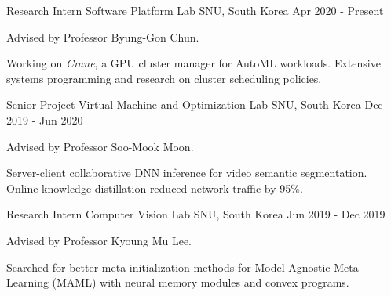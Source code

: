 

\begin{cventries}

  \cventry
    {Research Intern} %
    {Software Platform Lab} %
    {SNU, South Korea} %
    {Apr 2020 - Present} %
    {
      \begin{cvitems} %
        \item {Advised by Professor Byung-Gon Chun.}
        \item {Working on \textit{Crane}, a GPU cluster manager for AutoML workloads. Extensive systems programming and research on cluster scheduling policies.}
      \end{cvitems}
    }
    
  \cventry
    {Senior Project} %
    {Virtual Machine and Optimization Lab} %
    {SNU, South Korea} %
    {Dec 2019 - Jun 2020} %
    {
      \begin{cvitems} %
        \item {Advised by Professor Soo-Mook Moon.}
        \item {Server-client collaborative DNN inference for video semantic segmentation. Online knowledge distillation reduced network traffic by 95\%.}
      \end{cvitems}
    }
    
  \cventry
    {Research Intern} %
    {Computer Vision Lab} %
    {SNU, South Korea} %
    {Jun 2019 - Dec 2019} %
    {
      \begin{cvitems} %
        \item {Advised by Professor Kyoung Mu Lee.}
        \item {Searched for better meta-initialization methods for Model-Agnostic Meta-Learning (MAML) with neural memory modules and convex programs.}
      \end{cvitems}
    }
    

\end{cventries}
